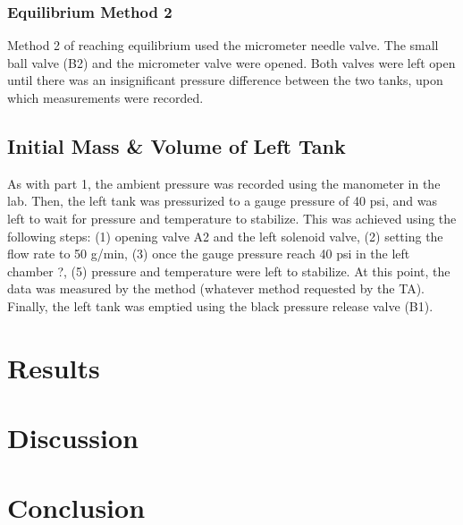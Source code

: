 \documentclass{article} %
\begin{document}
\begin{multicols}{2}
\subsubsection{Equilibrium Method 2}

Method 2 of reaching equilibrium used the micrometer needle valve.
The small ball valve (B2) and the micrometer valve were opened.
Both valves were left open until there was an insignificant pressure difference between the two tanks, upon which measurements were recorded.

\subsection{Initial Mass \& Volume of Left Tank}
\label{methods_initial_mass_volume_left_tank}

As with part 1, the ambient pressure was recorded using the manometer in the lab.
Then, the left tank was pressurized to a gauge pressure of 40 psi, and was left to wait for pressure and temperature to stabilize.
This was achieved using the following steps:
(1) opening valve A2 and the left solenoid valve, (2) setting the flow rate to 50 g/min, (3) once the gauge pressure reach 40 psi in the left chamber ?, (5) pressure and temperature were left to stabilize.
At this point, the data was measured by the method (whatever method requested by the TA).
Finally, the left tank was emptied using the black pressure release valve (B1).

\section{Results}
\label{results}

\section{Discussion}
\label{discussion}

\section{Conclusion}
\label{conclusion}

\label{last_page}

\end{multicols}  %

\newpage


\end{document}
